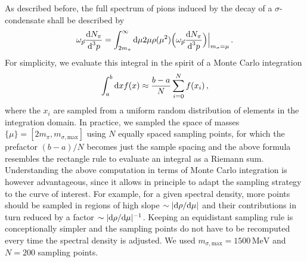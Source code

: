 
As described before, the full spectrum of pions induced by the decay of a $\sigma$-condensate shall be described by
\begin{equation}
    \omega_{\vec{p}}\frac{\text{d} N_\pi}{\text{d}^3p}=\int_{2m_\pi}^\infty\text{d}\mu 2\mu\rho(\mu^2)\Big(\omega_{\vec{p}}\frac{\text{d} N_\pi}{\text{d}^3p}\Big)\Big\vert_{m_\sigma=\mu}\,.
\end{equation}
For simplicity, we evaluate this integral in the spirit of a Monte Carlo integration 
\begin{equation}
    \int_a^b\text{d} xf(x)\approx\frac{b-a}{N}\sum_{i=0}^N f(x_i)\,,
\end{equation}
where the $x_i$ are sampled from a uniform random distribution of elements in the integration domain. In practice, we sampled the space of masses ${\{\mu\}=[2m_\pi,m_{\sigma,\text{max}}]}$ using $N$ equally spaced sampling points, for which the prefactor ${(b-a)/N}$ becomes just the sample spacing and the above formula resembles the rectangle rule to evaluate an integral as a Riemann sum. Understanding the above computation in terms of Monte Carlo integration is however advantageous, since it allows in principle to adapt the sampling strategy to the curve of interest. For example, for a given spectral density, more points should be sampled in regions of high slope ${\sim\vert\text{d}\rho/\text{d}\mu\vert}$ and their contributions in turn reduced by a factor ${\sim\vert\text{d}\rho/\text{d}\mu\vert^{-1}}$. Keeping an equidistant sampling rule is conceptionally simpler and the sampling points do not have to be recomputed every time the spectral density is adjusted. We used ${m_{\sigma,\text{max}}=1500\, \text{MeV}}$ and $N=200$ sampling points. 

